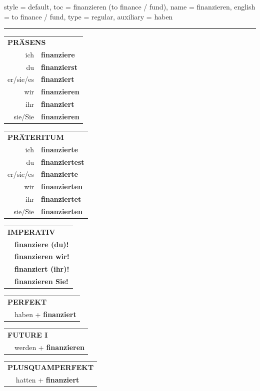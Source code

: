 \begin{verbentry}{
  style = {default},
  toc = {finanzieren (to finance / fund)},
  name = {finanzieren},
  english = {to finance / fund},
  type = {regular},
  auxiliary = {haben}
}


\vspace{5pt}
\hrule
\vspace{5pt}

\begin{tabular}{rl}
\multicolumn{2}{l}{\textbf{PRÄSENS}}\\
ich & \textbf{finanziere}\\
du & \textbf{finanzierst}\\
er/sie/es & \textbf{finanziert}\\
wir & \textbf{finanzieren}\\
ihr & \textbf{finanziert}\\
sie/Sie & \textbf{finanzieren}\\
\end{tabular}
\hfill
\begin{tabular}{rl}
\multicolumn{2}{l}{\textbf{PRÄTERITUM}}\\
ich & \textbf{finanzierte}\\
du & \textbf{finanziertest}\\
er/sie/es & \textbf{finanzierte}\\
wir & \textbf{finanzierten}\\
ihr & \textbf{finanziertet}\\
sie/Sie & \textbf{finanzierten}\\
\end{tabular}
\hfill
\begin{tabular}{rl}
\multicolumn{2}{l}{\textbf{IMPERATIV}}\\
& \textbf{finanziere (du)!}\\
& \textbf{finanzieren wir!}\\
& \textbf{finanziert (ihr)!}\\
& \textbf{finanzieren Sie!}\\
\end{tabular}

\vspace{10pt}

\begin{tabular}{rl}
\multicolumn{2}{l}{\textbf{PERFEKT}}\\
& haben + \textbf{finanziert}\\
\end{tabular}
\hfill
\begin{tabular}{rl}
\multicolumn{2}{l}{\textbf{FUTURE I}}\\
& werden + \textbf{finanzieren}\\
\end{tabular}
\hfill
\begin{tabular}{rl}
\multicolumn{2}{l}{\textbf{PLUSQUAMPERFEKT}}\\
& hatten + \textbf{finanziert}\\
\end{tabular}


\end{verbentry}
